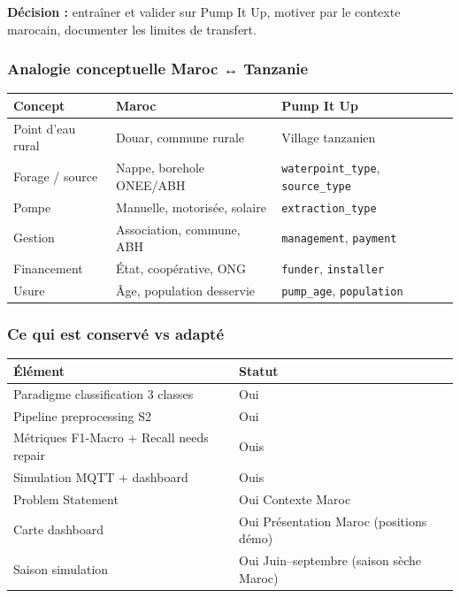 \documentclass[11pt,a4paper]{report}
\begin{document}
\textbf{Décision :} entraîner et valider sur Pump It Up, motiver par le contexte marocain, documenter les limites de transfert.



\subsubsection{Analogie conceptuelle Maroc ↔ Tanzanie}



\begin{longtable}{@{}lll@{}}
\toprule
Concept & Maroc & Pump It Up \\
\midrule
Point d'eau rural & Douar, commune rurale & Village tanzanien \\
Forage / source & Nappe, borehole ONEE/ABH & \texttt{waterpoint\_type}, \texttt{source\_type} \\
Pompe & Manuelle, motorisée, solaire & \texttt{extraction\_type} \\
Gestion & Association, commune, ABH & \texttt{management}, \texttt{payment} \\
Financement & État, coopérative, ONG & \texttt{funder}, \texttt{installer} \\
Usure & Âge, population desservie & \texttt{pump\_age}, \texttt{population} \\
\bottomrule
\end{longtable}




\subsubsection{Ce qui est conservé vs adapté}



\begin{longtable}{@{}ll@{}}
\toprule
Élément & Statut \\
\midrule
Paradigme classification 3 classes & Oui \\
Pipeline preprocessing S2 & Oui \\
Métriques F1-Macro + Recall needs repair & Ouis \\
Simulation MQTT + dashboard & Ouis \\
Problem Statement & Oui Contexte Maroc \\
Carte dashboard & Oui Présentation Maroc (positions démo) \\
Saison simulation & Oui Juin–septembre (saison sèche Maroc) \\
\bottomrule
\end{longtable}
\end{document}
